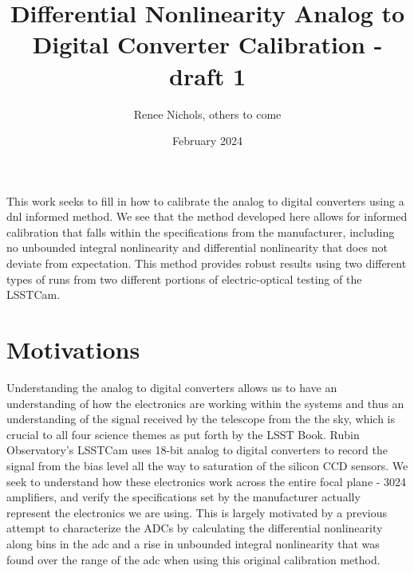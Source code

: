 \documentclass[11pt, letterpaper]{article}
\title{Differential Nonlinearity Analog to Digital Converter Calibration - draft 1}
\author{Renee Nichols, others to come}
\date{February 2024}
\begin{document}
\maketitle 

This work seeks to fill in how to calibrate the analog to digital converters using a dnl informed method. We see that the method developed here allows for informed calibration that falls within the specifications from the manufacturer, including no unbounded integral nonlinearity and differential nonlinearity that does not deviate from expectation. This method provides robust results using two different types of runs from two different portions of electric-optical testing of the LSSTCam. 

\section{Motivations}
Understanding the analog to digital converters allows us to have an understanding of how the electronics are working within the systems and thus an understanding of the signal received by the telescope from the the sky, which is crucial to all four science themes as put forth by the LSST Book. Rubin Observatory’s LSSTCam uses 18-bit analog to digital converters to record the signal from the bias level all the way to saturation of the silicon CCD sensors. We seek to understand how these electronics work across the entire focal plane - 3024 amplifiers, and verify the specifications set by the manufacturer actually represent the electronics we are using. This is largely motivated by a previous attempt to characterize the ADCs by calculating the differential nonlinearity along bins in the adc and a rise in unbounded integral nonlinearity that was found over the range of the adc when using this original calibration method. 
\end{document}
